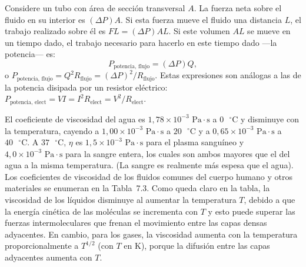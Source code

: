 \documentclass[12pt]{book}
\begin{document}
Considere un tubo con área de sección transversal $A$. La fuerza neta sobre el fluido en su interior es $(\Delta P)A$. Si esta fuerza mueve el fluido una distancia $L$, el trabajo realizado sobre él es $FL = (\Delta P)AL$. Si este volumen $AL$ se mueve en un tiempo dado, el trabajo necesario para hacerlo en este tiempo dado ---la potencia--- es:
\begin{equation}
P_{\text{potencia, flujo}} = (\Delta P) Q,
\label{eq:726}
\end{equation}
o $P_{\text{potencia, flujo}} = Q^2 R_{\text{flujo}} = (\Delta P)^2/R_{\text{flujo}}$. Estas expresiones son análogas a las de la potencia disipada por un resistor eléctrico: $P_{\text{potencia, elect}} = VI = I^2 R_{\text{elect}} = V^2 / R_{\text{elect}}$.

El coeficiente de viscosidad del agua es $1{,}78 \times 10^{-3}\text{ Pa}\cdot\text{s}$ a $0\text{ }^\circ\text{C}$ y disminuye con la temperatura, cayendo a $1{,}00 \times 10^{-3}\text{ Pa}\cdot\text{s}$ a $20\text{ }^\circ\text{C}$ y a $0{,}65 \times 10^{-3}\text{ Pa}\cdot\text{s}$ a $40\text{ }^\circ\text{C}$. A $37\text{ }^\circ\text{C}$, $\eta$ es $1{,}5 \times 10^{-3}\text{ Pa}\cdot\text{s}$ para el plasma sanguíneo y $4{,}0 \times 10^{-3}\text{ Pa}\cdot\text{s}$ para la sangre entera, los cuales son ambos mayores que el del agua a la misma temperatura. (La sangre es realmente más espesa que el agua). Los coeficientes de viscosidad de los fluidos comunes del cuerpo humano y otros materiales se enumeran en la Tabla~7.3. Como queda claro en la tabla, la viscosidad de los líquidos disminuye al aumentar la temperatura $T$, debido a que la energía cinética de las moléculas se incrementa con $T$ y esto puede superar las fuerzas intermoleculares que frenan el movimiento entre las capas densas adyacentes. En cambio, para los gases, la viscosidad aumenta con la temperatura proporcionalmente a $T^{1/2}$ (con $T$ en $\text{K}$), porque la difusión entre las capas adyacentes aumenta con $T$.
\end{document}
